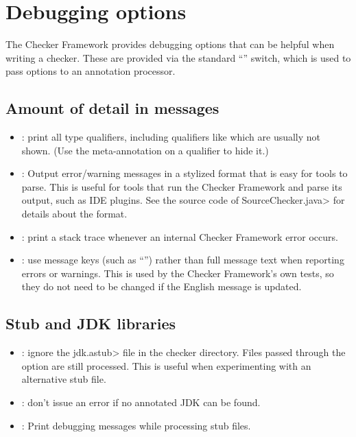 \section{Debugging options\label{debugging-options}}

The Checker Framework provides debugging options that can be helpful when
writing a checker. These are provided via the standard  ``''
switch, which is used to pass options to an annotation processor.

\subsection{Amount of detail in messages\label{debugging-options-detail}}

\begin{itemize}
\item {}: print all type qualifiers, including
qualifiers like  which are usually not shown.
(Use the  meta-annotation on a qualifier to hide it.)

\item {}: Output error/warning messages in a
  stylized format that is easy for tools to parse.  This is useful for
  tools that run the Checker Framework and parse its output, such as IDE
  plugins.  See the source code of \<SourceChecker.java> for details about
  the format.

\item {}: print a stack trace whenever an
internal Checker Framework error occurs.

\item {}: use message keys (such as ``'')
rather than full message text when reporting errors or warnings.  This is
used by the Checker Framework's own tests, so they do not need to be
changed if the English message is updated.

\end{itemize}

\subsection{Stub and JDK libraries\label{debugging-options-libraries}}

\begin{itemize}

\item {}:
  ignore the \<jdk.astub> file in the checker directory. Files passed
  through the  option are still processed. This is useful
  when experimenting with an alternative stub file.

\item {}:
  don't issue an error if no annotated JDK can be found.

\item {}:
  Print debugging messages while processing stub files.

\end{itemize}

